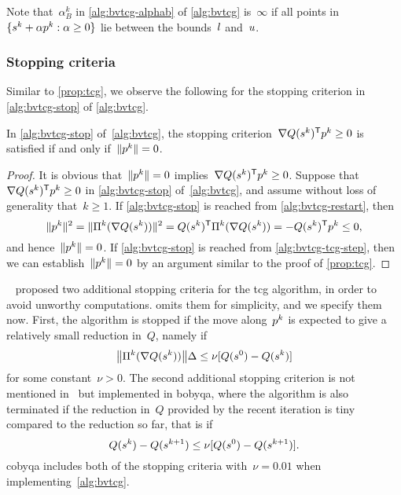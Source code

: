 Note that~$\alpha_B^k$ in \cref{alg:bvtcg-alphab} of \cref{alg:bvtcg} is~$\infty$ if all points in~$\set{\sstep[k] + \alpha \pstep[k] : \alpha \ge 0}$ lie between the bounds~$l$ and~$u$.

\subsubsection{Stopping criteria}

Similar to \cref{prop:tcg}, we observe the following for the stopping criterion in \cref{alg:bvtcg-stop} of \cref{alg:bvtcg}.

\begin{proposition}
    \label{prop:bvtcg}
    In \cref{alg:bvtcg-stop} of~\cref{alg:bvtcg}, the stopping criterion~$\nabla Q (\sstep[k])^{\T} \pstep[k] \ge 0$ is satisfied if and only if~$\norm{\pstep[k]} = 0$.
\end{proposition}

\begin{proof}
    It is obvious that~$\norm{\pstep[k]} = 0$ implies~$\nabla Q (\sstep[k])^{\T} \pstep[k] \ge 0$.
    Suppose that~$\nabla Q (\sstep[k])^{\T} \pstep[k] \ge 0$ in \cref{alg:bvtcg-stop} of~\cref{alg:bvtcg}, and assume without loss of generality that~$k \ge 1$.
    If \cref{alg:bvtcg-stop} is reached from \cref{alg:bvtcg-restart}, then
    \begin{equation*}
        \norm{\pstep[k]}^2 = \norm{\Pi^k(\nabla Q(\sstep[k]))}^2 =  Q (\sstep[k])^{\T}  \Pi^k(\nabla Q(\sstep[k])) = - Q (\sstep[k])^{\T}  \pstep[k] \le 0,
    \end{equation*}
    and hence~$\norm{\pstep[k]} = 0$.
    If \cref{alg:bvtcg-stop} is reached from \cref{alg:bvtcg-tcg-step}, then we can establish~$\norm{\pstep[k]} = 0$ by an argument similar to the proof of \cref{prop:tcg}.
\end{proof}

~\cite[\S~3]{Powell_2009} proposed two additional stopping criteria for the
\gls{tcg} algorithm, in order to avoid unworthy computations.
 omits them for simplicity, and we specify them now.
First, the algorithm is stopped if the move along~$\pstep[k]$ is expected to give a relatively small reduction in~$Q$, namely if
\begin{equation}
    \label{eq:bvtcg-stop1}
    \norm[\big]{\Pi^k(\nabla Q(\sstep[k]))} \rad \le \nu [Q(\sstep[0]) - Q(\sstep[k])]
\end{equation}
for some constant~$\nu > 0$.
The second additional stopping criterion is not mentioned in~\cite{Powell_2009} but implemented in
\gls{bobyqa}, where the algorithm is also terminated if the reduction in~$Q$ provided by the recent iteration is tiny compared to the reduction so far, that is if
\begin{equation}
    \label{eq:bvtcg-stop2}
    Q(\sstep[k]) - Q(\sstep[k + 1]) \le \nu [Q(\sstep[0]) - Q(\sstep[k + 1])].
\end{equation}
\Gls{cobyqa} includes both of the stopping criteria with~$\nu = 0.01$ when implementing~\cref{alg:bvtcg}.

